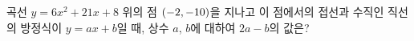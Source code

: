 곡선 $y=6x^2+21x+8$ 위의 점 $(-2{,}\mkern3mu\mathopen{}-10)$을 지나고 이 점에서의 접선과 수직인 직선의 방정식이 $y=ax+b$일 때, 상수 $a$, $b$에 대하여 $2a-b$의 값은?
